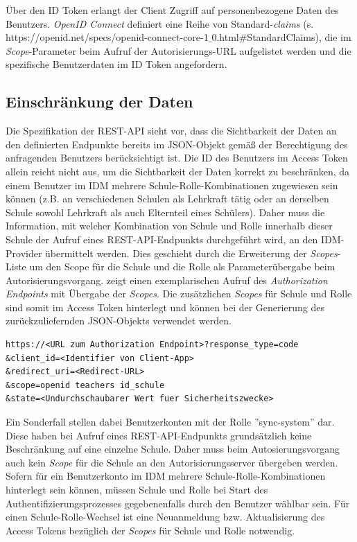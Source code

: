 Über den ID Token erlangt der Client Zugriff auf personenbezogene Daten des Benutzers. 
\textit{OpenID Connect} definiert eine Reihe von Standard-\textit{claims} (s. https://openid.net/specs/openid-connect-core-1$\_$0.html\#StandardClaims), die im \textit{Scope}-Parameter beim Aufruf der Autorisierungs-URL aufgelistet werden und die spezifische Benutzerdaten im ID Token angefordern.

\subsection{Einschränkung der Daten}
\label{auth:limit_data}

Die Spezifikation der REST-API sieht vor, dass die Sichtbarkeit der Daten an den definierten Endpunkte bereits im JSON-Objekt gemäß der Berechtigung des anfragenden Benutzers berücksichtigt ist. 
Die ID des Benutzers im Access Token allein reicht nicht aus, um die Sichtbarkeit der Daten korrekt zu beschränken, da einem Benutzer im IDM mehrere Schule-Rolle-Kombinationen zugewiesen sein können (z.B. an verschiedenen Schulen als Lehrkraft tätig oder an derselben Schule sowohl Lehrkraft als auch Elternteil eines Schülers). 
Daher muss die Information, mit welcher Kombination von Schule und Rolle innerhalb dieser Schule der Aufruf eines REST-API-Endpunkts durchgeführt wird, an den IDM-Provider übermittelt werden. 
Dies geschieht durch die Erweiterung der \textit{Scopes}-Liste um den Scope für die Schule und die Rolle als Parameterübergabe beim Autorisierungsvorgang. 
 zeigt einen exemplarischen Aufruf des \textit{Authorization Endpoints} mit Übergabe der \textit{Scopes}.
Die zusätzlichen \textit{Scopes} für Schule und Rolle sind somit im Access Token hinterlegt und können bei der Generierung des zurückzuliefernden JSON-Objekts verwendet werden.

\begin{lstlisting}[caption={Beispielhafter Aufruf des Authorization Endpoints},label={listing:authorization_request},frame=tlrb]
https://<URL zum Authorization Endpoint>?response_type=code
&client_id=<Identifier von Client-App>
&redirect_uri=<Redirect-URL>
&scope=openid teachers id_schule
&state=<Undurchschaubarer Wert fuer Sicherheitszwecke>
\end{lstlisting}

Ein Sonderfall stellen dabei Benutzerkonten mit der Rolle ''sync-system'' dar. 
Diese haben bei Aufruf eines REST-API-Endpunkts grundsätzlich keine Beschränkung auf eine einzelne Schule. 
Daher muss beim Autosierungsvorgang auch kein \textit{Scope} für die Schule an den Autorisierungsserver übergeben werden. \\

Sofern für ein Benutzerkonto im IDM mehrere Schule-Rolle-Kombinationen hinterlegt sein können, müssen Schule und Rolle bei Start des Authentifizierungsprozesses gegebenenfalls durch den Benutzer wählbar sein. 
Für einen Schule-Rolle-Wechsel ist eine Neuanmeldung bzw. Aktualisierung des Access Tokens bezüglich der \textit{Scopes} für Schule und Rolle notwendig.